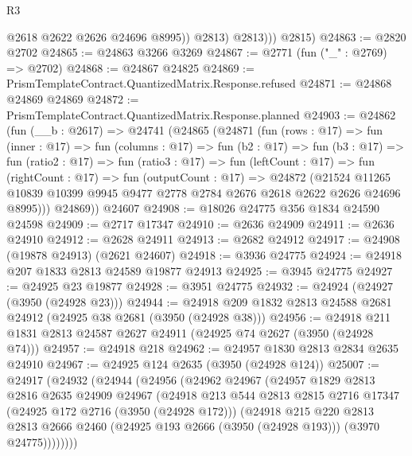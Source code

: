 \begin{lexlean}{R3}
\begin{coremodule}
                  @2618
                  @2622
                  @2626
                  @24696
                  @8995))
              @2813)
            @2813)))
      @2815)
@24863 := @2820 @2702
@24865 := @24863 @3266 @3269
@24867 := @2771 (fun ("_" : @2769) => @2702)
@24868 := @24867 @24825
@24869 := PrismTemplateContract.QuantizedMatrix.Response.refused
@24871 := @24868 @24869 @24869
@24872 := PrismTemplateContract.QuantizedMatrix.Response.planned
@24903 := @24862
    (fun (__b : @2617) =>
    @24741
      (@24865
        (@24871
          (fun (rows : @17) =>
          fun (inner : @17) =>
          fun (columns : @17) =>
          fun (b2 : @17) =>
          fun (b3 : @17) =>
          fun (ratio2 : @17) =>
          fun (ratio3 : @17) =>
          fun (leftCount : @17) =>
          fun (rightCount : @17) =>
          fun (outputCount : @17) =>
          @24872
            (@21524
              @11265
              @10839
              @10399
              @9945
              @9477
              @2778
              @2784
              @2676
              @2618
              @2622
              @2626
              @24696
              @8995)))
        @24869))
    @24607
@24908 := @18026 @24775 @356 @1834 @24590 @24598
@24909 := @2717 @17347
@24910 := @2636 @24909
@24911 := @2636 @24910
@24912 := @2628 @24911
@24913 := @2682 @24912
@24917 := @24908 (@19878 @24913) (@2621 @24607)
@24918 := @3936 @24775
@24924 := @24918 @207 @1833 @2813 @24589 @19877 @24913
@24925 := @3945 @24775
@24927 := @24925 @23 @19877
@24928 := @3951 @24775
@24932 := @24924 (@24927 (@3950 (@24928 @23)))
@24944 := @24918 @209 @1832 @2813 @24588 @2681 @24912 (@24925 @38 @2681 (@3950 (@24928 @38)))
@24956 := @24918 @211 @1831 @2813 @24587 @2627 @24911 (@24925 @74 @2627 (@3950 (@24928 @74)))
@24957 := @24918 @218
@24962 := @24957 @1830 @2813 @2834 @2635 @24910
@24967 := @24925 @124 @2635 (@3950 (@24928 @124))
@25007 := @24917
    (@24932
      (@24944
        (@24956
          (@24962
            @24967
            (@24957
              @1829
              @2813
              @2816
              @2635
              @24909
              @24967
              (@24918
                @213
                @544
                @2813
                @2815
                @2716
                @17347
                (@24925 @172 @2716 (@3950 (@24928 @172)))
                (@24918
                  @215
                  @220
                  @2813
                  @2813
                  @2666
                  @2460
                  (@24925 @193 @2666 (@3950 (@24928 @193)))
                  (@3970 @24775))))))))

\end{coremodule}
\end{lexlean}
